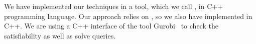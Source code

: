 


\medskip

We have implemented our techniques in a tool, which we call \drefine{}, in \textsc{C++} programming language. Our approach relies on \deeppoly{}, so we also have implemented \deeppoly{} in \textsc{C++}. We are using a \textsc{C++} interface of the tool Gurobi~\cite{gurobioptimizer} to check the satisfiability as well as solve  \maxsat{} queries. %

